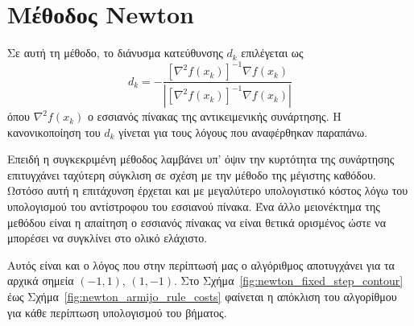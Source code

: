 \documentclass[a4paper,12pt]{article}
\begin{document}
\section*{Μέθοδος  Newton}
Σε αυτή τη μέθοδο, το διάνυσμα κατεύθυνσης $d_k$ επιλέγεται ως 
\[d_k = -\frac{[\nabla^2 f(x_k)]^{-1} \nabla f(x_k)}{|[\nabla^2 f(x_k)]^{-1} \nabla f(x_k)|}\]
όπου $\nabla^2 f(x_k)$ ο εσσιανός πίνακας της αντικειμενικής συνάρτησης. Η κανονικοποίηση του $d_k$ 
γίνεται για τους λόγους που αναφέρθηκαν παραπάνω. 

Επειδή η συγκεκριμένη μέθοδος λαμβάνει υπ' όψιν
την κυρτότητα της συνάρτησης επιτυγχάνει ταχύτερη σύγκλιση σε σχέση με την μέθοδο της μέγιστης καθόδου.
Ωστόσο αυτή η επιτάχυνση έρχεται και με μεγαλύτερο υπολογιστικό κόστος λόγω του υπολογισμού του αντίστροφου
του εσσιανού πίνακα. Ένα άλλο μειονέκτημα της μεθόδου είναι η απαίτηση ο εσσιανός πίνακας να είναι θετικά 
ορισμένος ώστε να μπορέσει να συγκλίνει στο ολικό ελάχιστο. 

Αυτός είναι και ο λόγος που στην περίπτωσή μας
ο αλγόριθμος αποτυγχάνει για τα αρχικά σημεία $(-1, 1)$, $(1, -1)$. Στο Σχήμα~\ref{fig:newton_fixed_step_contour}
έως Σχήμα~\ref{fig:newton_armijo_rule_costs} φαίνεται η απόκλιση του αλγορίθμου για κάθε περίπτωση υπολογισμού
του βήματος.
\end{document}
